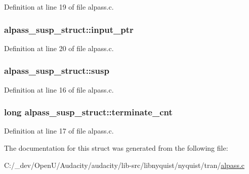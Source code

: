 Definition at line 19 of file alpass.\+c.

\subsubsection[{\texorpdfstring{input\+\_\+ptr}{input_ptr}}]{ alpass\+\_\+susp\+\_\+struct\+::input\+\_\+ptr}\hypertarget{structalpass__susp__struct_a870bd68b4996dfcefd184938668ca7fc}{}\label{structalpass__susp__struct_a870bd68b4996dfcefd184938668ca7fc}


Definition at line 20 of file alpass.\+c.

\subsubsection[{\texorpdfstring{susp}{susp}}]{ alpass\+\_\+susp\+\_\+struct\+::susp}\hypertarget{structalpass__susp__struct_a06e9fdfd660f90af3be1251ed825cd0f}{}\label{structalpass__susp__struct_a06e9fdfd660f90af3be1251ed825cd0f}


Definition at line 16 of file alpass.\+c.

\subsubsection[{\texorpdfstring{terminate\+\_\+cnt}{terminate_cnt}}]{\setlength{\rightskip}{0pt plus 5cm}long alpass\+\_\+susp\+\_\+struct\+::terminate\+\_\+cnt}\hypertarget{structalpass__susp__struct_a9b6b64717fd6a54f5dd04e9a5afeb874}{}\label{structalpass__susp__struct_a9b6b64717fd6a54f5dd04e9a5afeb874}


Definition at line 17 of file alpass.\+c.



The documentation for this struct was generated from the following file\+:\begin{DoxyCompactItemize}
\item 
C\+:/\+\_\+dev/\+Open\+U/\+Audacity/audacity/lib-\/src/libnyquist/nyquist/tran/\hyperlink{alpass_8c}{alpass.\+c}\end{DoxyCompactItemize}
